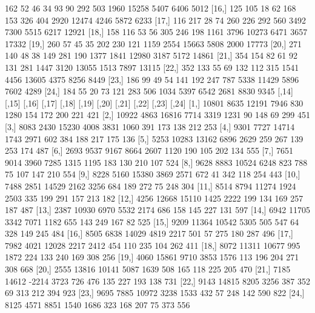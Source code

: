 \documentclass[a4paper, 12pt]{article}
\begin{document}
\begin{table}[H]
\begin{Schunk}
\begin{Soutput}
[15,]  162   52   46   34   93   90  292  503 1960 15258  5407  6406  5012
[16,]  125  105   18   62  168  153  326  404 2920 12474  4246  5872  6233
[17,]  116  217   28   74  260  226  292  560 3492  7300  5515  6217 12921
[18,]  158  116   53   56  305  246  198 1161 3796 10273  6471  3657 17332
[19,]  260   57   45   35  202  230  121 1159 2554 15663  5808  2000 17773
[20,]  271  140   48   38  149  281  190 1377 1841 12980  3187  5172 14861
[21,]  354  154   82   61   92  131  281 1447 3120 13055  1513  7897 13115
[22,]  352  133   55   69  132  112  315 1541 4456 13605  4375  8256  8449
[23,]  186   99   49   54  141  192  247  787 5338 11429  5896  7602  4289
[24,]  184   55   20   73  121  283  506 1034 5397  6542  2681  8830  9345
      [,14] [,15] [,16] [,17] [,18] [,19] [,20] [,21] [,22] [,23] [,24]
 [1,] 10801  8635 12191  7946   830  1280   154   172   200   221   421
 [2,] 10922  4863 16816  7714  3319  1231    90   148    69   299   451
 [3,]  8083  2430 15230  4008  3831  1060   391   173   138   212   253
 [4,]  9301  7727 14714  1743  2971   602   384   188   217   175   136
 [5,]  5253 10283 13162  6896  2629   259   267   139   253   174   487
 [6,]  2693  9537  9167  8664  2607  1120   190   105   202   134   555
 [7,]  7651  9014  3960  7285  1315  1195   183   130   210   107   524
 [8,]  9628  8883 10524  6248   823   788    75   107   147   210   554
 [9,]  8228  5160 15380  3869  2571   672    41   342   118   254   443
[10,]  7488  2851 14529  2162  3256   684   189   272    75   248   304
[11,]  8514  8794 11274  1924  2503   335   199   291   157   213   182
[12,]  4256 12668 15110  1425  2222   199   134   169   257   187   487
[13,]  2387 10930  6970  5532  2174   686   158   145   227   131   597
[14,]  6942 11705  3342  7071  1182   655   143   249   167    82   525
[15,]  9209 11364 10542  5305   505   547    64   328   149   245   484
[16,]  8505  6838 14029  4819  2217   501    57   275   180   287   496
[17,]  7982  4021 12028  2217  2412   454   110   235   104   262   411
[18,]  8072 11311 10677   995  1872   224   133   240   169   308   256
[19,]  4060 15861  9710  3853  1576   113   196   204   271   308   668
[20,]  2555 13816 10141  5087  1639   508   165   118   225   205   470
[21,]  7185 14612 -2214  3723   726   476   135   227   193   138   731
[22,]  9143 14815  8205  3256   387   352    69   313   212   394   923
[23,]  9695  7885 10972  3238  1533   432    57   248   142   590   822
[24,]  8125  4571  8851  1540  1686   323   168   207    75   373   556
\end{Soutput}
\end{Schunk}
\end{table}
\end{document}
